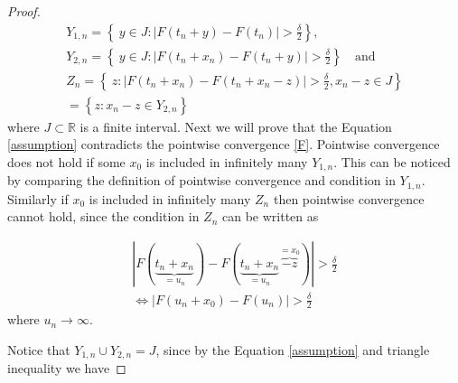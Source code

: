 \documentclass[english,12pt,a4paper,pdftex,sci,utf8]{aaltothesis} %
\begin{document}
\begin{proof}
\begin{align*}
Y_{1,n} = \left\{ \ y \in J: \left| F(t_n+y)-F(t_n) \right| > \frac{\delta}{2} \right\}, \\
Y_{2,n} = \left\{ \ y \in J: \left| F(t_n+x_n)-F(t_n+y) \right| > \frac{\delta}{2} \right\} \quad  \textrm{and} \\
Z_n = \left\{ \ z: \left| F(t_n+x_n)-F(t_n+x_n-z) \right| > \frac{\delta}{2}, x_n-z \in J \right\} \\
= \left\{ z: x_n-z \in Y_{2,n} \right\}
\end{align*}
where $J \subset \mathbb{R}$ is a finite interval. Next we will prove that the Equation \eqref{assumption} contradicts the pointwise convergence \eqref{F}. Pointwise convergence does not hold if some $x_0$ is included in infinitely many $Y_{1,n}$. This can be noticed by comparing the definition of pointwise convergence and condition in $Y_{1,n}$. Similarly if $x_0$ is included in infinitely many $Z_n$ then pointwise convergence cannot hold, since the condition in $Z_{n}$ can be written as

\begin{equation*}
\begin{split}
\left| F(\underbrace{t_n+x_n}_{=u_n})-F(\underbrace{t_n+x_n}_{=u_n}\overbrace{-z}^{=x_0}) \right| > \frac{\delta}{2} \\
\Leftrightarrow \left| F(u_n+x_0)-F(u_n) \right| > \frac{\delta}{2}
\end{split}
\end{equation*}
where $u_n \rightarrow \infty$.

Notice that $Y_{1,n} \cup Y_{2,n}=J$, since by the Equation \eqref{assumption} and triangle inequality we have


\end{proof}
\end{document}
